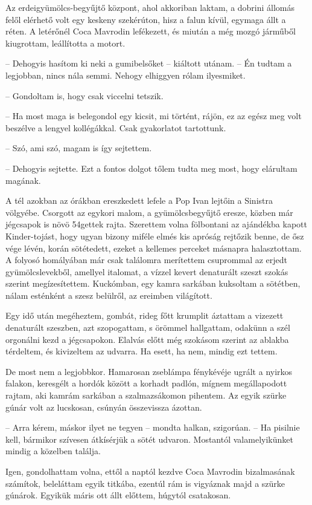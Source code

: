 \documentclass{IEEEtran}
\begin{document}
Az erdeigyümölcs-begyűjtő központ, ahol akkoriban laktam, a dobrini állomás
felől elérhető volt egy keskeny szekérúton, hisz a falun kívül, egymaga állt a
réten. A letérőnél Coca Mavrodin lefékezett, és miután a még mozgó járműből
kiugrottam, leállította a motort.

– Dehogyis hasítom ki neki a gumibelsőket – kiáltott utánam. – Én tudtam a
legjobban, nincs nála semmi. Nehogy elhiggyen rólam ilyesmiket.

– Gondoltam is, hogy csak viccelni tetszik.

– Ha most maga is belegondol egy kicsit, mi történt, rájön, ez az egész meg
volt beszélve a lengyel kollégákkal. Csak gyakorlatot tartottunk.

– Szó, ami szó, magam is így sejtettem.

– Dehogyis sejtette. Ezt a fontos dolgot tőlem tudta meg most, hogy elárultam
magának.

A tél azokban az órákban ereszkedett lefele a Pop Ivan lejtőin a Sinistra
völgyébe. Csorgott az egykori malom, a gyümölcsbegyűjtő eresze, közben már
jégcsapok is növö 54gettek rajta. Szerettem volna fölbontani az ajándékba
kapott Kinder-tojást, hogy ugyan bizony miféle elmés kis apróság rejtőzik
benne, de ősz vége lévén, korán sötétedett, ezeket a kellemes perceket
másnapra halasztottam. A folyosó homályában már csak találomra merítettem
csuprommal az erjedt gyümölcslevekből, amellyel italomat, a vízzel kevert
denaturált szeszt szokás szerint megízesítettem. Kuckómban, egy kamra sarkában
kuksoltam a sötétben, nálam esténként a szesz belülről, az ereimben
világított.

Egy idő után megéheztem, gombát, rideg főtt krumplit áztattam a vizezett
denaturált szeszben, azt szopogattam, s örömmel hallgattam, odakünn a szél
orgonálni kezd a jégcsapokon. Elalvás előtt még szokásom szerint az ablakba
térdeltem, és kivizeltem az udvarra. Ha esett, ha nem, mindig ezt tettem.

De most nem a legjobbkor. Hamarosan zseblámpa fénykévéje ugrált a nyirkos
falakon, keresgélt a hordók között a korhadt padlón, mígnem megállapodott
rajtam, aki kamrám sarkában a szalmazsákomon pihentem. Az egyik szürke gúnár
volt az lucskosan, csúnyán összevissza ázottan.

– Arra kérem, máskor ilyet ne tegyen – mondta halkan, szigorúan. – Ha pisilnie
kell, bármikor szívesen átkísérjük a sötét udvaron. Mostantól valamelyikünket
mindig a közelben találja.

Igen, gondolhattam volna, ettől a naptól kezdve Coca Mavrodin bizalmasának
számítok, beleláttam egyik titkába, ezentúl rám is vigyáznak majd a szürke
gúnárok. Egyikük máris ott állt előttem, húgytól csatakosan.
\end{document}
